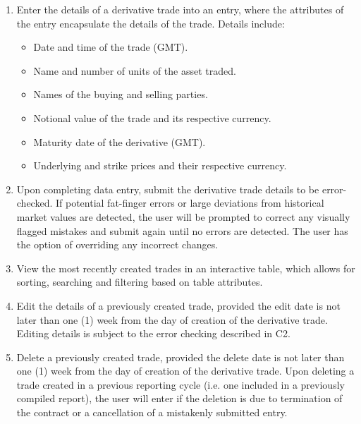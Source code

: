 \documentclass[8pt]{extarticle}
\begin{document}
\begin{enumerate}[label=C\arabic*]
\item Enter the details of a derivative trade into an entry, where the attributes of the entry encapsulate the details of the trade. Details include:  

\begin{itemize}
\item Date and time of the trade (GMT). 

\item Name and number of units of the asset traded. 

\item Names of the buying and selling parties. 

\item Notional value of the trade and its respective currency. 

\item Maturity date of the derivative (GMT). 

\item Underlying and strike prices and their respective currency.  
\end{itemize}

\item Upon completing data entry, submit the derivative trade details to be error-checked. If potential fat-finger errors or large deviations from historical market values are detected, the user will be prompted to correct any visually flagged mistakes and submit again until no errors are detected. The user has the option of overriding any incorrect changes. 

\item View the most recently created trades in an interactive table, which allows for sorting, searching and filtering based on table attributes. 

\item Edit the details of a previously created trade, provided the edit date is not later than one (1) week from the day of creation of the derivative trade. Editing details is subject to the error checking described in C2. 

\item Delete a previously created trade, provided the delete date is not later than one (1) week from the day of creation of the derivative trade. Upon deleting a trade created in a previous reporting cycle (i.e. one included in a previously compiled report), the user will enter if the deletion is due to termination of the contract or a cancellation of a mistakenly submitted entry. 


\end{enumerate}
\end{document}

